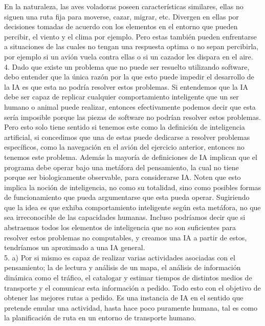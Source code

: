 En la naturaleza, las aves voladoras poseen características similares, ellas no siguen una ruta fija para moverse, cazar, migrar, etc. Divergen en ellas por decisiones tomadas de acuerdo con los elementos en el entorno que pueden percibir, el viento y el clima por ejemplo. Pero estas también pueden enfrentarse a situaciones de las cuales no tengan una respuesta optima o no sepan percibirla, por ejemplo si un avión vuela contra ellas o si un cazador les dispara en el aire. \\

4. Dado que existe un problema que no puede ser resuelto utilizando software, debo entender que la única razón por la que esto puede impedir el desarrollo de la IA es que esta no podría resolver estos problemas. Si entendemos que la IA debe ser capaz de replicar cualquier comportamiento inteligente que un ser humano o animal puede realizar, entonces efectivamente podemos decir que esta sería imposible porque las piezas de software no podrían resolver estos problemas. Pero esto solo tiene sentido si tenemos este como la definición de inteligencia artificial, si concedimos que una de estas puede dedicarse a resolver problemas específicos, como la navegación en el avión del ejercicio anterior, entonces no tenemos este problema. Además la mayoría de definiciones de IA implican que el programa debe operar bajo una metáfora del pensamiento, la cual no tiene porque ser biologicamente observable, para considerarse IA. Noten que esto implica la noción de inteligencia, no como su totalidad, sino como posibles formas de funcionamiento que pueda argumentarse que esta pueda operar. Sugiriendo que la idea es que exhiba comportamiento inteligente según esta metáfora, no que sea irreconocible de las capacidades humanas. Incluso podríamos decir que si abstraemos todos los elementos de inteligencia que no son suficientes para resolver estos problemas no computables, y creamos una IA a partir de estos, tendríamos un aproximado a una IA general. \\

5. a) Por si mismo es capaz de realizar varias actividades asociadas con el pensamiento; la de lectura y análisis de un mapa, el análisis de información dinámica como el tráfico, el catalogar y estimar tiempos de distintos medios de transporte y el comunicar esta información a pedido. Todo esto con el objetivo de obtener las mejores rutas a pedido. Es una instancia de IA en el sentido que pretende emular una actividad, hasta hace poco puramente humana, tal es como la planificación de ruta en un entorno de transporte humano. \\

